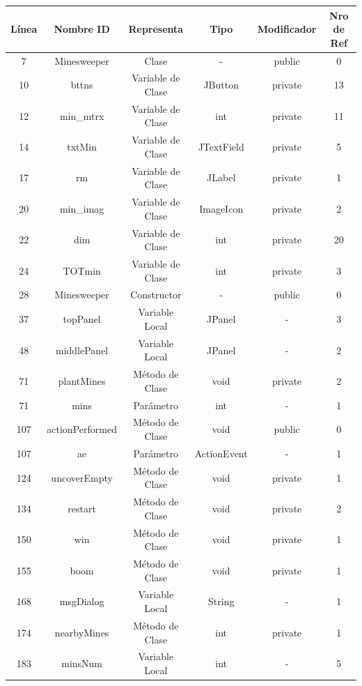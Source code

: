 \documentclass[a4paper,12pt]{report}
\begin{document}
\begin{table}
\centering
	\begin{tabular}{| c | c | c | c | c | c | }      
       \hline
  	   \textsf{Línea} & \textsf{Nombre ID} & \textsf{Representa} & \textsf{Tipo} & \textsf{Modificador} & \textsf{Nro de Ref}\\ \hline
7&Minesweeper&Clase&-&public&0 \\ \hline  	   
10&bttns&Variable de Clase&JButton&private&13 \\ \hline
12&min\_mtrx&Variable de Clase&int&private&11 \\ \hline
14&txtMin&Variable de Clase&JTextField&private&5 \\ \hline
17&rm&Variable de Clase&JLabel&private&1 \\ \hline
20&min\_imag&Variable de Clase&ImageIcon&private&2 \\ \hline
22&dim&Variable de Clase&int&private&20 \\ \hline
24&TOTmin&Variable de Clase&int&private&3 \\ \hline
28&Minesweeper&Constructor&-&public&0 \\ \hline
37&topPanel&Variable Local&JPanel&-&3 \\ \hline
48&middlePanel&Variable Local&JPanel&-&2 \\ \hline
71&plantMines&Método de Clase&void&private&2 \\ \hline
71&mins&Parámetro&int&-&1 \\ \hline
107&actionPerformed&Método de Clase&void&public&0 \\ \hline
107&ae&Parámetro&ActionEvent&-&1 \\ \hline
124&uncoverEmpty&Método de Clase&void&private&1 \\ \hline
134&restart&Método de Clase&void&private&2 \\ \hline
150&win&Método de Clase&void&private&1 \\ \hline
155&boom&Método de Clase&void&private&1 \\ \hline
168&msgDialog&Variable Local&String&-&1 \\ \hline
174&nearbyMines&Método de Clase&int&private&1 \\ \hline
183&minsNum&Variable Local&int&-&5 \\ \hline
   	\end{tabular}  
	 

\end{table}
\end{document}
